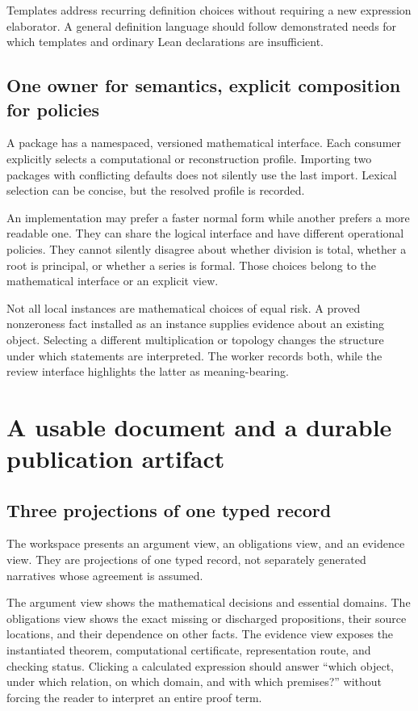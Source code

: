 \documentclass[11pt,letterpaper]{article}
\numberwithin{equation}{section}
\begin{document}
Templates address recurring definition choices without requiring a new expression
elaborator. A general definition language should follow demonstrated needs for
which templates and ordinary Lean declarations are insufficient.

\subsection{One owner for semantics, explicit composition for policies}
A package has a namespaced, versioned mathematical interface. Each consumer
explicitly selects a computational or reconstruction profile. Importing two
packages with conflicting defaults does not silently use the last import.
Lexical selection can be concise, but the resolved profile is recorded.

An implementation may prefer a faster normal form while another prefers a
more readable one. They can share the logical interface and have different
operational policies. They cannot silently disagree about whether division is
total, whether a root is principal, or whether a series is formal. Those choices
belong to the mathematical interface or an explicit view.

Not all local instances are mathematical choices of equal risk. A proved
nonzeroness fact installed as an instance supplies evidence about an existing
object. Selecting a different multiplication or topology changes the structure
under which statements are interpreted. The worker records both, while the
review interface highlights the latter as meaning-bearing.

\section{A usable document and a durable publication artifact}\label{sec:document}
\subsection{Three projections of one typed record}
The workspace presents an argument view, an obligations view, and an evidence
view. They are projections of one typed record, not separately generated
narratives whose agreement is assumed.

The argument view shows the mathematical decisions and essential domains. The
obligations view shows the exact missing or discharged propositions, their source
locations, and their dependence on other facts. The evidence view exposes the
instantiated theorem, computational certificate, representation route, and
checking status. Clicking a calculated expression should answer ``which object,
under which relation, on which domain, and with which premises?'' without forcing
the reader to interpret an entire proof term.
\end{document}
